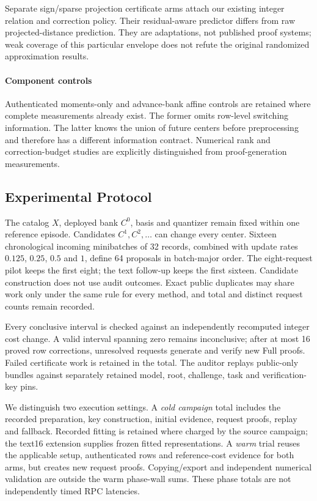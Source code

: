 Separate sign/sparse projection certificate arms attach our existing
integer relation and correction policy. Their residual-aware predictor
differs from raw projected-distance prediction. They are adaptations,
not published proof systems; weak coverage of this particular envelope
does not refute the original randomized approximation results.

\paragraph{Component controls}
Authenticated moments-only and advance-bank affine controls are retained
where complete measurements already exist. The former omits row-level
switching information. The latter knows the union of future centers before
preprocessing and therefore has a different information contract. Numerical
rank and correction-budget studies are explicitly distinguished from
proof-generation measurements.

\subsection{Experimental Protocol}
\label{sec:ccd-protocol}
The catalog $X$, deployed bank $C^0$, basis and quantizer remain fixed within
one reference episode. Candidates $C^1,C^2,\ldots$ can change every center.
Sixteen chronological incoming minibatches of 32 records, combined with
update rates $0.125$, $0.25$, $0.5$ and $1$, define 64 proposals in batch-major
order. The eight-request pilot keeps the first eight; the text follow-up
keeps the first sixteen. Candidate construction does not use audit outcomes.
Exact public duplicates may share work only under the same rule for every
method, and total and distinct request counts remain recorded.

Every conclusive interval is checked against an independently recomputed
integer cost change. A valid interval spanning zero remains inconclusive;
after at most 16 proved row corrections, unresolved requests generate and
verify new Full proofs. Failed certificate work is retained in the total.
The auditor replays public-only bundles against separately retained model,
root, challenge, task and verification-key pins.

We distinguish two execution settings. A \emph{cold campaign} total
includes the recorded preparation, key construction, initial evidence,
request proofs, replay and fallback. Recorded fitting is retained where
charged by the source campaign; the text16 extension supplies frozen fitted
representations. A \emph{warm} trial reuses the applicable setup, authenticated
rows and reference-cost evidence for both arms, but creates new request
proofs. Copying/export and independent numerical validation are outside the
warm phase-wall sums. These phase totals are not independently timed RPC
latencies.

